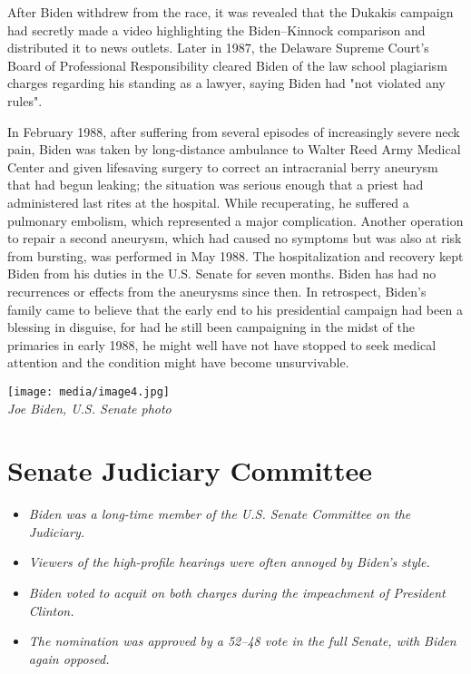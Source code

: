 After Biden withdrew from the race, it was revealed that the Dukakis
campaign had secretly made a video highlighting the Biden--Kinnock
comparison and distributed it to news outlets. Later in 1987, the
Delaware Supreme Court's Board of Professional Responsibility cleared
Biden of the law school plagiarism charges regarding his standing as a
lawyer, saying Biden had "not violated any rules".

In February 1988, after suffering from several episodes of increasingly
severe neck pain, Biden was taken by long-distance ambulance to Walter
Reed Army Medical Center and given lifesaving surgery to correct an
intracranial berry aneurysm that had begun leaking; the situation was
serious enough that a priest had administered last rites at the
hospital. While recuperating, he suffered a pulmonary embolism, which
represented a major complication. Another operation to repair a second
aneurysm, which had caused no symptoms but was also at risk from
bursting, was performed in May 1988. The hospitalization and recovery
kept Biden from his duties in the U.S. Senate for seven months. Biden
has had no recurrences or effects from the aneurysms since then. In
retrospect, Biden's family came to believe that the early end to his
presidential campaign had been a blessing in disguise, for had he still
been campaigning in the midst of the primaries in early 1988, he might
well have not have stopped to seek medical attention and the condition
might have become unsurvivable.

\texttt{[image: media/image4.jpg]}\\
\emph{Joe Biden, U.S. Senate photo}

\section{Senate Judiciary Committee}\label{senate-judiciary-committee}

\begin{itemize}
\item
  \emph{Biden was a long-time member of the U.S. Senate Committee on the
  Judiciary.}
\item
  \emph{Viewers of the high-profile hearings were often annoyed by
  Biden's style.}
\item
  \emph{Biden voted to acquit on both charges during the impeachment of
  President Clinton.}
\item
  \emph{The nomination was approved by a 52--48 vote in the full Senate,
  with Biden again opposed.}
\end{itemize}

